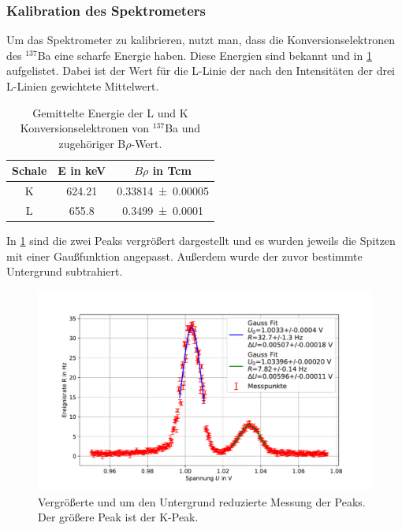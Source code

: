 \documentclass[
	a4paper,
	12pt,
	pagesize,
	ngerman
]{scrartcl}
\begin{document}
	\subsubsection{Kalibration des Spektrometers}
	Um das Spektrometer zu kalibrieren, nutzt man, dass die Konversionselektronen des $^{137}$Ba eine scharfe Energie haben.
	Diese Energien sind bekannt und in \cref{tb_konversion} aufgelistet.
	Dabei ist der Wert für die L-Linie der nach den Intensitäten der drei L-Linien gewichtete Mittelwert.

\begin{table}[H]
		\centering
		\begin{tabular}{c | c | c  }
			 Schale&E in \si{keV} & $B\rho$ in \si{Tcm} \\ \hline
			 K & \SI{624.21}{} & \SI{0.33814(5)}{} \\
			 L & \SI{655.8}{} & \SI{0.3499(1)}{} \\
		\end{tabular}
		\caption{
		Gemittelte Energie der L und K Konversionselektronen von $^{137}$Ba und zugehöriger B$\rho$-Wert. \cite{Anleitung}
		}
		\label{tb_konversion}
\end{table}
In \cref{fg_kalibration} sind die zwei Peaks vergrößert dargestellt und es wurden jeweils die Spitzen mit einer Gaußfunktion angepasst.
Außerdem wurde der zuvor bestimmte Untergrund subtrahiert.
	\begin{figure}[H]
			\includegraphics[width=  \linewidth]{img/kalibration}
			\caption{
			Vergrößerte und um den Untergrund reduzierte Messung der Peaks.
			Der größere Peak ist der K-Peak.
			}
			\label{fg_kalibration}
	\end{figure}
\end{document}
